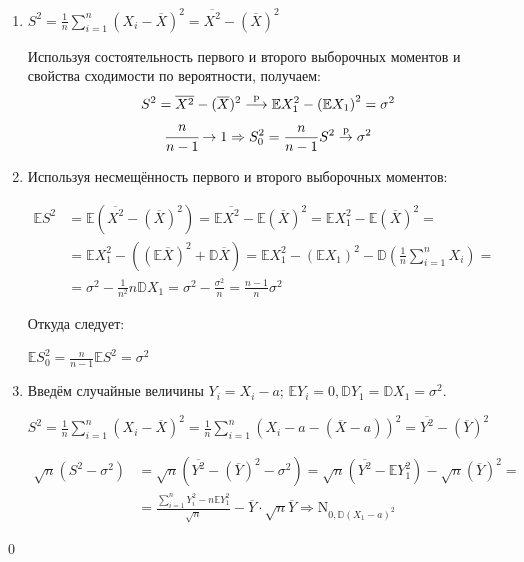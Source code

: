 \documentclass[oneside,final,14pt]{extreport}
\renewenvironment{proof}{{\bfseries Доказательство.}}{\qed}
\theoremstyle{definition}
\begin{document}
\begin{proof}
\begin{enumerate}
    \item \( S^{2}=\frac{1}{n} \sum_{i=1}^{n}\left(X_{i}-\overline{X}\right)^{2}=\overline{X^{2}}-(\overline{X})^{2} \)

    Используя состоятельность первого и второго выборочных моментов и свойства сходимости по вероятности, получаем:
    \begin{gather*}
        S^{2}=\overline{X^{2}}-(\overline{X})^{2} \stackrel{\mathrm{p}}{\longrightarrow} \mathbb{E} X_{1}^{2}-\left(\mathbb{E} X_{1}\right)^{2}=\sigma^{2} \\
        \cfrac{n}{n-1} \rightarrow 1 \Rightarrow S_{0}^{2}=\frac{n}{n-1} S^{2} \stackrel{\mathrm{p}}{\rightarrow} \sigma^{2}
    \end{gather*}
    
    \item Используя несмещённость первого и второго выборочных моментов:
    
    \(
    \begin{aligned}
\mathbb{E} S^{2} &=\mathbb{E}\left(\overline{X^{2}}-(\overline{X})^{2}\right)=\mathbb{E} \overline{X^{2}}-\mathbb{E}(\overline{X})^{2}=\mathbb{E} X_{1}^{2}-\mathbb{E}(\overline{X})^{2}=\\
&=\mathbb{E} X_{1}^{2}-\left((\mathbb{E} \overline{X})^{2}+\mathbb{D} \overline{X}\right)=\mathbb{E} X_{1}^{2}-\left(\mathbb{E} X_{1}\right)^{2}-\mathbb{D}\left(\frac{1}{n} \sum_{i=1}^{n} X_{i}\right)=\\
&=\sigma^{2}-\frac{1}{n^{2}} n \mathbb{D} X_{1}=\sigma^{2}-\frac{\sigma^{2}}{n}=\frac{n-1}{n} \sigma^{2}
\end{aligned}
    \)
    
    Откуда следует:
    
    \( \mathbb{E} S_{0}^{2}=\frac{n}{n-1} \mathbb{E} S^{2}=\sigma^{2} \)
    
    \item Введём случайные величины \( Y_{i}=X_{i}-a \); \( \mathbb{E}Y_{i} = 0, \mathbb{D} Y_{1}=\mathbb{D} X_{1}=\sigma^{2} \).
    
    \( S^{2}=\frac{1}{n} \sum_{i=1}^{n}\left(X_{i}-\overline{X}\right)^{2}=\frac{1}{n} \sum_{i=1}^{n}\left(X_{i}-a-(\overline{X}-a)\right)^{2}=\overline{Y^{2}}-(\overline{Y})^{2} \)
    
    \( \begin{aligned}
\sqrt{n}\left(S^{2}-\sigma^{2}\right) &=\sqrt{n}\left(\overline{Y^{2}}-(\overline{Y})^{2}-\sigma^{2}\right)=\sqrt{n}\left(\overline{Y^{2}}-\mathbb{E} Y_{1}^{2}\right)-\sqrt{n}(\overline{Y})^{2}=\\
&=\frac{\sum_{i=1}^{n} Y_{i}^{2}-n \mathbb{E} Y_{1}^{2}}{\sqrt{n}}-\overline{Y} \cdot \sqrt{n} \overline{Y} \Rightarrow \mathrm{N}_{0, \mathbb{D}\left(X_{1}-a\right)^{2}}
\end{aligned} \)


\end{enumerate}
\end{proof}
\end{document}
